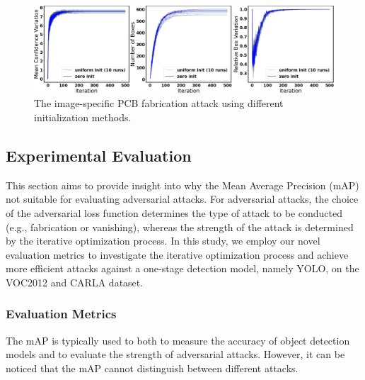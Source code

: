 \begin{figure}[btph]
    \centering
    \includegraphics[width=0.80\linewidth]{figures/chapter_detection/hardware/init.png}
    \caption{The image-specific  PCB fabrication attack using different initialization methods.}
    \label{fig:init}
\end{figure}

\subsection{Experimental Evaluation}

This section aims to provide insight into why the Mean Average Precision (mAP) not suitable for evaluating adversarial attacks. For adversarial attacks, the choice of the adversarial loss function determines the type of attack to be conducted (e.g., fabrication or vanishing), whereas the strength of the attack is determined by the iterative optimization process. In this study, we employ our novel evaluation metrics to investigate the  iterative optimization process  and achieve more efficient attacks against a one-stage detection model, namely YOLO, on the VOC2012 \cite{pascal-voc-2012} and CARLA \cite{deschaud2021kitticarla} dataset.


\subsubsection{Evaluation Metrics}

The mAP \cite{cartucho2018} is typically used to both to measure the accuracy of object detection models and to evaluate the strength of adversarial attacks. However, it can be noticed that the mAP cannot distinguish between different attacks. 

